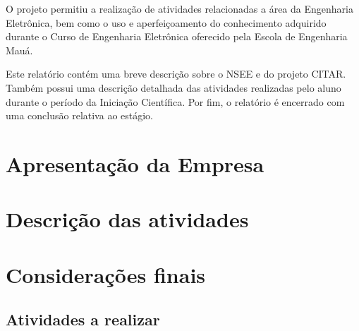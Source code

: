 \documentclass[
	12pt,				%
	openright,			%
	twoside,			%
	a4paper,			%
	english,			%
	french,				%
	spanish,			%
	brazil				%
	]{abntex2}
\begin{document}
	O projeto permitiu a realização de atividades relacionadas a área da Engenharia Eletrônica, bem como o uso e aperfeiçoamento do conhecimento adquirido durante o Curso de Engenharia Eletrônica oferecido pela Escola de Engenharia Mauá.
	
	Este relatório contém uma breve descrição sobre o NSEE e do projeto CITAR. Também possui uma descrição detalhada das atividades realizadas pelo aluno durante o período da Iniciação Científica. Por fim, o relatório é encerrado com uma conclusão relativa ao estágio.
	

\part{Apresentação da Empresa}





%

\part{Descrição das atividades}



\part{Considerações finais}

\chapter{Atividades a realizar}
\end{document}
